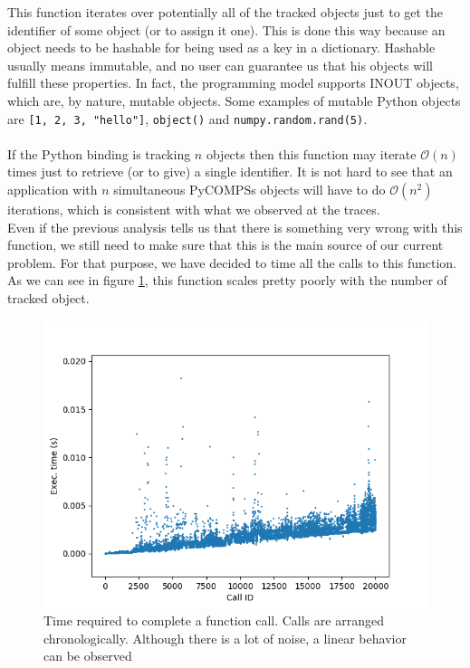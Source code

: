 This function iterates over potentially all of the tracked objects just to get the identifier of some object (or to assign it one). This is done this way because an object needs to be hashable for being used as a key in a dictionary. Hashable usually means immutable, and no user can guarantee us that his objects will fulfill these properties. In fact, the programming model supports INOUT objects, which are, by nature, mutable objects. Some examples of mutable Python objects are \verb|[1, 2, 3, "hello"]|, \verb|object()| and \verb|numpy.random.rand(5)|.\\
\\
If the Python binding is tracking $n$ objects then this function may iterate $\mathcal{O}(n)$ times just to retrieve (or to give) a single identifier. It is not hard to see that an application with $n$ simultaneous PyCOMPSs objects will have to do $\mathcal{O}(n^2)$ iterations, which is consistent with what we observed at the traces.
\\
Even if the previous analysis tells us that there is something very wrong with this function, we still need to make sure that this is the main source of our current problem. For that purpose, we have decided to time all the calls to this function. As we can see in figure \ref{fig:task_overhead_exec_times}, this function scales pretty poorly with the number of tracked object.
\begin{figure}
\centering
\includegraphics[scale = 0.5]{figures/task_overhead_exec_times.png}
\caption{Time required to complete a function call. Calls are arranged chronologically. Although there is a lot of noise, a linear behavior can be observed}
\label{fig:task_overhead_exec_times}
\end{figure}

